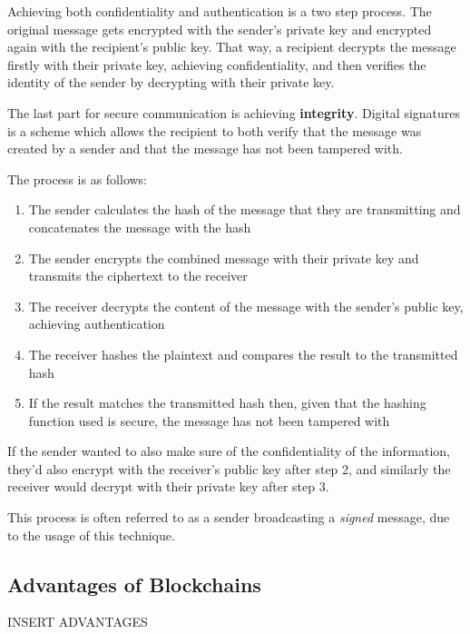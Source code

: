 Achieving both confidentiality and authentication is a two step process. The original message gets encrypted with the sender's private key and encrypted again with the recipient's public key. That way, a recipient decrypts the message firstly with their private key, achieving confidentiality, and then verifies the identity of the sender by decrypting with their private key.

The last part for secure communication is achieving \textbf{integrity}. Digital signatures is a scheme which allows the recipient to both verify that the message was created by a sender and that the message has not been tampered with. 

The process is as follows:
\begin{enumerate}
    \item The sender calculates the hash of the message that they are transmitting and concatenates the message with the hash
    \item The sender encrypts the combined message with their private key and transmits the ciphertext to the receiver  
    \item The receiver decrypts the content of the message with the sender's public key, achieving authentication
    \item The receiver hashes the plaintext and compares the result to the transmitted hash
    \item If the result matches the transmitted hash  then, given that the hashing function used is secure,
    the message has not been tampered with
\end{enumerate}

If the sender wanted to also make sure of the confidentiality of the information, they'd also encrypt with the receiver's public key after step 2, and similarly the receiver would decrypt with their private key after step 3. 

This process is often referred to as a sender broadcasting a \textit{signed} message, due to the usage of this technique.


\subsection{Advantages of Blockchains}
INSERT ADVANTAGES


